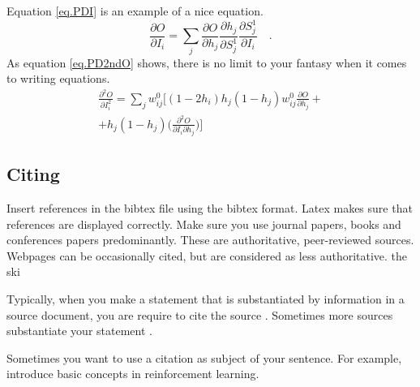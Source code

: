 \documentclass[12pt,oneside,a4paper]{article}
\begin{document}
Equation \ref{eq.PDI} is an example of a nice equation.
\begin{equation}
\frac{\partial O}{\partial I_{i}} = \sum_{j}{\frac{\partial O}{\partial h_{j}}\frac{\partial h_{j}}{\partial S_{j}^{1}}\frac{\partial S_{j}^{1}}{\partial I_{i}}}\quad.
\label{eq.PDI}
\end{equation}
As equation \ref{eq.PD2ndO} shows, there is no limit to your fantasy when it comes to writing equations.
\begin{eqnarray}
\nonumber\frac{\partial^{2} O}{\partial I_{i}^{2}} =
\sum_{j}w_{ij}^{0}\Bigg [ (1 - 2h_{i})h_{j}(1 - h_{j})w_{ij}^{0}\frac{\partial O}{\partial h_{j}} +\\
+ h_{j}(1 - h_{j})\Bigg(\frac{\partial^{2} O}{\partial I_{i} \partial h_{j}}\Bigg)
\Bigg ]\label{eq.PD2ndO}
\end{eqnarray}

\subsection{Citing}

Insert references in the bibtex file using the bibtex format. Latex makes sure that references are displayed correctly. Make sure you use journal papers, books and conferences papers predominantly. These are authoritative, peer-reviewed sources. Webpages can be occasionally cited, but are considered as less authoritative.
the ski

Typically, when you make a statement that is substantiated by information in a source document, you are require to cite the source \citep{bullinaria2009}. Sometimes more sources substantiate your statement \citep{soltoggioSteilNeuralComputation2013,soltoggioHTP2014}. 

Sometimes you want to use a citation as subject of your sentence. For example, \citet{SuttonBarto1998} introduce basic concepts in reinforcement learning.





\end{document}
